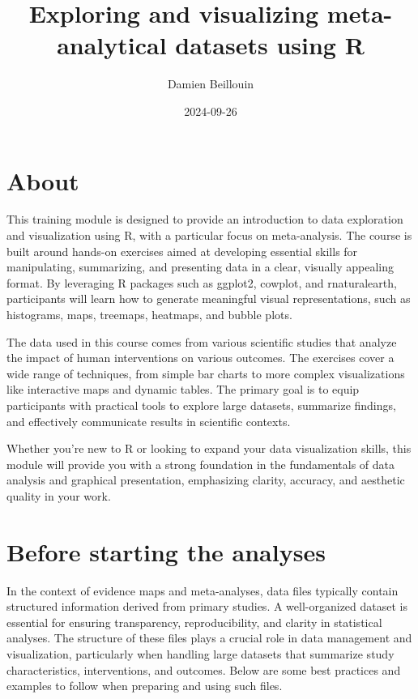 \documentclass[
]{book}
\title{Exploring and visualizing meta-analytical datasets using R}
\author{Damien Beillouin}
\date{2024-09-26}
\begin{document}
\maketitle

{
\setcounter{tocdepth}{1}
\tableofcontents
}
\chapter{About}\label{about}

This training module is designed to provide an introduction to data exploration and visualization using R, with a particular focus on meta-analysis. The course is built around hands-on exercises aimed at developing essential skills for manipulating, summarizing, and presenting data in a clear, visually appealing format. By leveraging R packages such as ggplot2, cowplot, and rnaturalearth, participants will learn how to generate meaningful visual representations, such as histograms, maps, treemaps, heatmaps, and bubble plots.

The data used in this course comes from various scientific studies that analyze the impact of human interventions on various outcomes. The exercises cover a wide range of techniques, from simple bar charts to more complex visualizations like interactive maps and dynamic tables. The primary goal is to equip participants with practical tools to explore large datasets, summarize findings, and effectively communicate results in scientific contexts.

Whether you're new to R or looking to expand your data visualization skills, this module will provide you with a strong foundation in the fundamentals of data analysis and graphical presentation, emphasizing clarity, accuracy, and aesthetic quality in your work.

\chapter{Before starting the analyses}\label{before-starting-the-analyses}

In the context of evidence maps and meta-analyses, data files typically contain structured information derived from primary studies.
A well-organized dataset is essential for ensuring transparency, reproducibility, and clarity in statistical analyses.
The structure of these files plays a crucial role in data management and visualization, particularly when handling large datasets that summarize study characteristics, interventions, and outcomes.
Below are some best practices and examples to follow when preparing and using such files.
\end{document}
